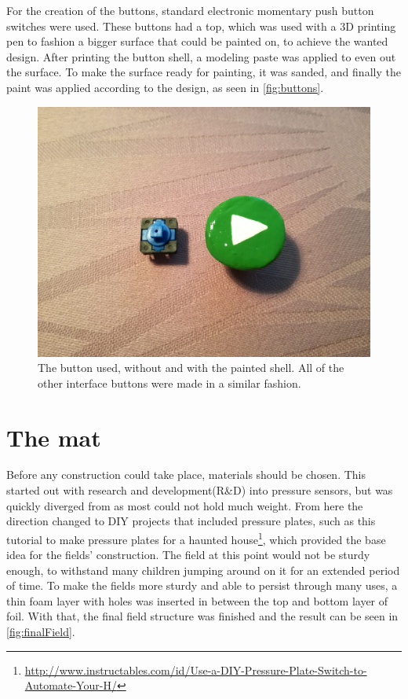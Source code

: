 	For the creation of the buttons, standard electronic momentary push button switches were used. These buttons had a top, which was used with a 3D printing pen to fashion a bigger surface that could be painted on, to achieve the wanted design. After printing the button shell, a modeling paste was applied to even out the surface. To make the surface ready for painting, it was sanded, and finally the paint was applied according to the design, as seen in \autoref{fig:buttons}.
	\begin{figure}[H]
		\centering
		\includegraphics[width=0.7\linewidth]{figure/Design/buttons}
		\caption{The button used, without and with the painted shell. All of the other interface buttons were made in a similar fashion.}
		\label{fig:buttons}
	\end{figure}
		
\section{The mat}\label{sec:theMat}%
	Before any construction could take place, materials should be chosen. This started out with research and development(R\&D) into pressure sensors, but was quickly diverged from as most could not hold much weight. From here the direction changed to DIY projects that included pressure plates, such as this tutorial to make pressure plates for a haunted house\footnote{\url{http://www.instructables.com/id/Use-a-DIY-Pressure-Plate-Switch-to-Automate-Your-H/}}, which provided the base idea for the fields' construction. The field at this point would not be sturdy enough, to withstand many children jumping around on it for an extended period of time. To make the fields more sturdy and able to persist through many uses, a thin foam layer with holes was inserted in between the top and bottom layer of foil. With that, the final field structure was finished and the result can be seen in \autoref{fig:finalField}.\\
	
